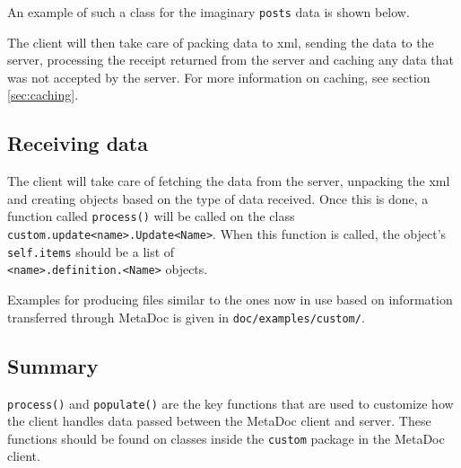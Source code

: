 An example of such a class for the imaginary \texttt{posts} data is shown
below.


The client will then take care of packing data to \gls{xml}, sending the data
to the server, processing the receipt returned from the server and caching any
data that was not accepted by the server. For more information on caching, see
section \ref{sec:caching}.

\subsection{Receiving data}
\label{sec:customizing_client_recieve}
The client will take care of fetching the data from the server, unpacking the
\gls{xml} and creating objects based on the type of data received. Once this is
done, a function called \texttt{process()} will be called on the class
\texttt{custom.update<name>.Update<Name>}. When this function is called, the
object's \texttt{self.items} should be a list of \\
\texttt{<name>.definition.<Name>} objects.

Examples for producing files similar to the ones now in use based on
information transferred through MetaDoc is given in
\texttt{doc/examples/custom/}.

\subsection{Summary}
\texttt{process()} and \texttt{populate()} are the key functions that are used
to customize how the client handles data passed between the MetaDoc client and
server. These functions should be found on classes inside the \texttt{custom}
package in the MetaDoc client. 
